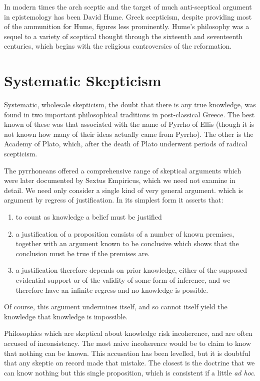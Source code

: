 In modern times the arch sceptic and the target of much anti-sceptical
argument in epistemology has been David Hume. 
Greek scepticism, despite providing most of the ammunition for Hume,
figures less prominently. 
Hume's philosophy was a sequel to a variety of sceptical thought through
the sixteenth and seventeenth centuries, which begins with the
religious controversies of the reformation.  

\section{Systematic Skepticism}

Systematic, wholesale skepticism, the doubt that there is any
true knowledge, was found in two important philosophical traditions
in post-classical Greece.
The best known of these was that associated with the name of Pyrrho of
Ellis (though it is not known how many of their ideas actually came from Pyrrho).
The other is the Academy of Plato, which, after the  death of Plato
underwent periods of radical scepticism.

The pyrrhoneans offered a comprehensive range of skeptical arguments which were later documented by Sextus Empiricus, which we need not examine in detail.
We need only consider a single kind of very general argument. which is argument by regress of justification.
In its simplest form it asserts that:

\begin{enumerate}
\item to count as knowledge a belief must be justified
\item a justification of a proposition consists of a number of known premises, together with an argument known to be conclusive which shows that the conclusion must be true if the premises are.
\item a justification therefore depends on prior knowledge, either of the supposed evidential support or of the validity of some form of inference, and we therefore have an infinite regress and no knowledge is possible.
\end{enumerate}

Of course, this argument undermines itself, and so cannot itself yield the knowledge that knowledge is impossible.


Philosophies which are skeptical about knowledge risk incoherence, and are often accused of inconsistency.
The most naive incoherence would be to claim to know that nothing can be known.
This accusation has been levelled, but it is doubtful that any skeptic on record made that mistake.
The closest is the doctrine that we can know nothing but this single proposition, which is consistent if a little {\it ad hoc}.


